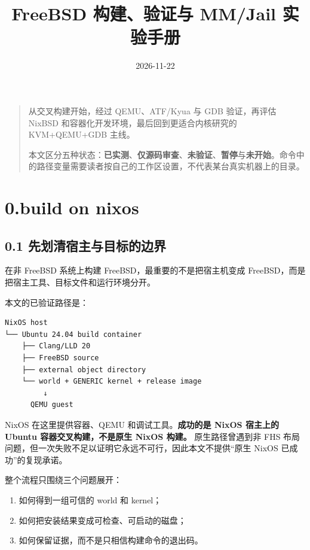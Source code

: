 \documentclass[
  11pt,
  UTF8,
  a4paper,
  fontset=fandol]{ctexart}
\title{FreeBSD 构建、验证与 MM/Jail 实验手册}
\author{}
\date{2026-11-22}
\providecommand{\tightlist}{%
  \setlength{\itemsep}{0pt}\setlength{\parskip}{0pt}}
\begin{document}
\maketitle

{
\hypersetup{linkcolor=}
\setcounter{tocdepth}{3}
\tableofcontents
}
\begin{quote}
从交叉构建开始，经过 QEMU、ATF/Kyua 与 GDB 验证，再评估 NixBSD
和容器化开发环境，最后回到更适合内核研究的 KVM+QEMU+GDB 主线。

本文区分五种状态：\textbf{已实测}、\textbf{仅源码审查}、\textbf{未验证}、\textbf{暂停}与\textbf{未开始}。命令中的路径变量需要读者按自己的工作区设置，不代表某台真实机器上的目录。
\end{quote}

\section{0.build on nixos}\label{build-on-nixos}

\subsection{0.1
先划清宿主与目标的边界}\label{ux5148ux5212ux6e05ux5bbfux4e3bux4e0eux76eeux6807ux7684ux8fb9ux754c}

在非 FreeBSD 系统上构建 FreeBSD，最重要的不是把宿主机变成
FreeBSD，而是把宿主工具、目标文件和运行环境分开。

本文的已验证路径是：

\begin{lstlisting}
NixOS host
└── Ubuntu 24.04 build container
    ├── Clang/LLD 20
    ├── FreeBSD source
    ├── external object directory
    └── world + GENERIC kernel + release image
         ↓
      QEMU guest
\end{lstlisting}

NixOS 在这里提供容器、QEMU 和调试工具。\textbf{成功的是 NixOS 宿主上的
Ubuntu 容器交叉构建，不是原生 NixOS 构建。} 原生路径曾遇到非 FHS
布局问题，但一次失败不足以证明它永远不可行，因此本文不提供``原生 NixOS
已成功''的复现承诺。

整个流程只围绕三个问题展开：

\begin{enumerate}
\def\labelenumi{\arabic{enumi}.}
\tightlist
\item
  如何得到一组可信的 world 和 kernel；
\item
  如何把安装结果变成可检查、可启动的磁盘；
\item
  如何保留证据，而不是只相信构建命令的退出码。
\end{enumerate}
\end{document}
